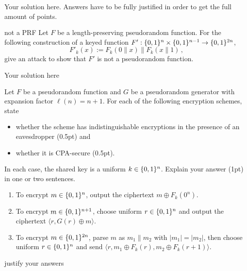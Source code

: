 \documentclass[a4paper,10pt]{article}
\begin{document}
\begin{solution}
  Your solution here. Answers have to be fully justified in order to get the full amount of points.
\end{solution}

\begin{nquestion}{2}{not a PRF}
Let $F$ be a length-preserving pseudorandom function. For the following construction of a keyed function $F':\{0,1\}^n \times \{0,1\}^{n-1} \rightarrow \{0,1\}^{2n}$,
\[
F'_k(x):=F_k(0 \| x) \| F_k(x \| 1) \, ,
\]
give an attack to show that $F'$ is not a pseudorandom function.
\end{nquestion}
\begin{solution}
  Your solution here
\end{solution}

\begin{question}{6}
Let $F$  be a pseudorandom function and $G$  be a pseudorandom generator with expansion factor $\ell(n)=n+1$. For each of the following encryption schemes, state
\begin{itemize}
\item whether the scheme has indistinguishable encryptions in the presence of an eavesdropper (0.5pt) and
\item whether it is CPA-secure (0.5pt).
\end{itemize}
In each case, the shared key is a uniform $k \in \{0,1\}^n$. Explain your answer (1pt) in one or two sentences.

\begin{enumerate}
\item To encrypt $m \in \{0,1\}^n$, output the ciphertext $m \oplus F_k(0^n)$.
\item To encrypt $m \in \{0,1\}^{n+1}$, choose uniform $r \in \{0,1\}^n$ and output the ciphertext $\langle r, G(r) \oplus m\rangle$.
\item To encrypt $m \in \{0,1\}^{2n}$, parse $m$ as $m_1 \| m_2$ with $|m_1|=|m_2|$, then choose uniform $r \in \{0,1\}^n$ and send $\langle r, m_1 \oplus F_k(r), m_2 \oplus F_k(r+1) \rangle$.
\end{enumerate}
\end{question}

\begin{solution}
justify your answers
\end{solution}
\end{document}
